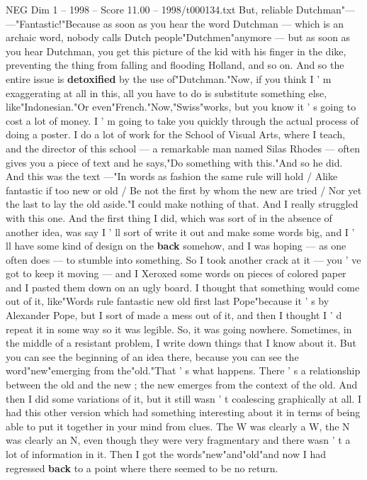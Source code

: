 \begin{textsample}{NEG Dim 1 – 1998 – Score 11.00 – 1998/t000134.txt}
But, reliable Dutchman"— —"Fantastic!"Because as soon as you hear the word Dutchman — which is an archaic word, nobody calls Dutch people"Dutchmen"anymore — but as soon as you hear Dutchman, you get this picture of the kid with his finger in the dike, preventing the thing from falling and flooding Holland, and so on.
And so the entire issue is \textbf{detoxified} by the use of"Dutchman."Now, if you think I ' m exaggerating at all in this, all you have to do is substitute something else, like"Indonesian."Or even"French."Now,"Swiss"works, but you know it ' s going to cost a lot of money.
I ' m going to take you quickly through the actual process of doing a poster.
I do a lot of work for the School of Visual Arts, where I teach, and the director of this school — a remarkable man named Silas Rhodes — often gives you a piece of text and he says,"Do something with this."And so he did.
And this was the text —"In words as fashion the same rule will hold / Alike fantastic if too new or old / Be not the first by whom the new are tried / Nor yet the last to lay the old aside."I could make nothing of that.
And I really struggled with this one.
And the first thing I did, which was sort of in the absence of another idea, was say I ' ll sort of write it out and make some words big, and I ' ll have some kind of design on the \textbf{back} somehow, and I was hoping — as one often does — to stumble into something.
So I took another crack at it — you ' ve got to keep it moving — and I Xeroxed some words on pieces of colored paper and I pasted them down on an ugly board.
I thought that something would come out of it, like"Words rule fantastic new old first last Pope"because it ' s by Alexander Pope, but I sort of made a mess out of it, and then I thought I ' d repeat it in some way so it was legible.
So, it was going nowhere.
Sometimes, in the middle of a resistant problem, I write down things that I know about it.
But you can see the beginning of an idea there, because you can see the word"new"emerging from the"old."That ' s what happens.
There ' s a relationship between the old and the new ; the new emerges from the context of the old.
And then I did some variations of it, but it still wasn ' t coalescing graphically at all.
I had this other version which had something interesting about it in terms of being able to put it together in your mind from clues.
The W was clearly a W, the N was clearly an N, even though they were very fragmentary and there wasn ' t a lot of information in it.
Then I got the words"new"and"old"and now I had regressed \textbf{back} to a point where there seemed to be no return.

\end{textsample}

